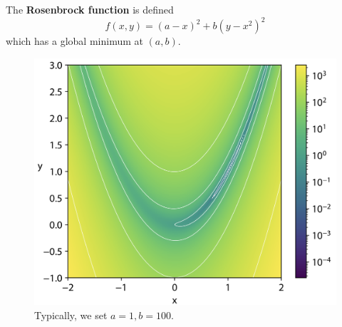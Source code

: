\begin{definition}
  The \textbf{Rosenbrock function} is defined 
  \begin{equation}
    f(x, y) = (a - x)^2 + b (y - x^2)^2
  \end{equation}
  which has a global minimum at $(a, b)$. 

  \begin{figure}[H]
    \centering 
    \includegraphics[scale=0.4]{img/rosenbrock.png}
    \caption{Typically, we set $a = 1, b = 100$. } 
    \label{fig:rosenbrock}
  \end{figure}
\end{definition}

